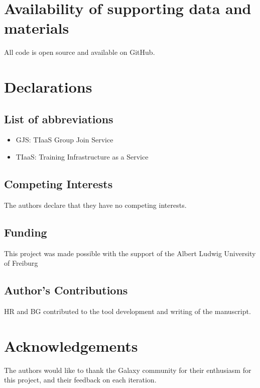 \documentclass[a4paper,num-refs]{oup-contemporary}
\begin{document}
\section{Availability of supporting data and materials}
All code is open source and available on GitHub.

\section{Declarations}

\subsection{List of abbreviations}

\begin{itemize}
\item GJS: TIaaS Group Join Service
\item TIaaS: Training Infrastructure as a Service
\end{itemize}


\subsection{Competing Interests}
The authors declare that they have no competing interests.


\subsection{Funding}
This project was made possible with the support of the Albert Ludwig University of Freiburg

\subsection{Author's Contributions}
HR and BG contributed to the tool development and writing of the manuscript.

\section{Acknowledgements}
The authors would like to thank the Galaxy community for their enthusiasm for this project, and their feedback on each iteration.


\end{document}
